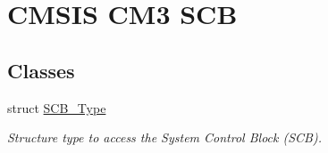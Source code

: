 \hypertarget{group___c_m_s_i_s___c_m3___s_c_b}{\section{C\-M\-S\-I\-S C\-M3 S\-C\-B}
\label{group___c_m_s_i_s___c_m3___s_c_b}
}
\subsection*{Classes}
\begin{DoxyCompactItemize}
\item 
struct \hyperlink{struct_s_c_b___type}{S\-C\-B\-\_\-\-Type}
\begin{DoxyCompactList}\small\item\em Structure type to access the System Control Block (S\-C\-B). \end{DoxyCompactList}\end{DoxyCompactItemize}
